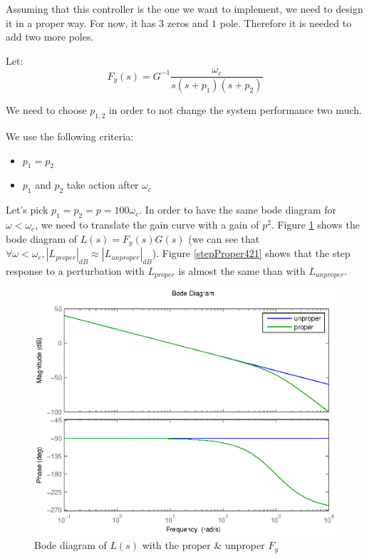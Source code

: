 Assuming that this controller is the one we want to implement, we need to design it in a proper way. For now, it has $3$ zeros and $1$ pole. Therefore it is needed to add two more poles.

Let:
$$F_y(s) = G^{-1}\frac{\omega_c}{s(s+p_1)(s+p_2)}$$

We need to choose $p_{1,2}$ in order to not change the system performance two much.

We use the following criteria:

\begin{itemize}
    \item $p_1 = p_2$
    \item $p_1$ and $p_2$ take action after $\omega_c$ 
\end{itemize}

Let's pick $p_1 = p_2 = p = 100\omega_c$. In order to have the same bode diagram for $\omega < \omega_c$, we need to translate the gain curve with a gain of $p^2$. Figure \ref{bodeProper421} shows the bode diagram of $L(s) = F_y(s) G(s)$ (we can see that $\forall \omega < \omega_c, |L_{proper}|_{dB} \approx |L_{unproper}|_{dB}$). Figure \ref{stepProper421} shows that the step response to a perturbation with $L_{proper}$ is almost the same than with $L_{unproper}$.

\begin{figure}[h!b]
    \includegraphics[width=\columnwidth]{fig/bodeProper421.eps}
    \caption{Bode diagram of $L(s)$ with the proper \& unproper $F_y$} 
    \label{bodeProper421}
\end{figure}

